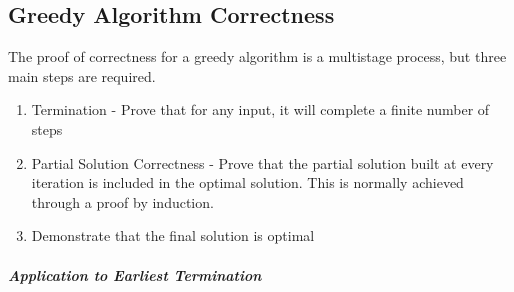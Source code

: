 \documentclass[12pt,letterpaper]{article}
\begin{document}
\subsection{Greedy Algorithm Correctness}
The proof of correctness for a greedy algorithm is a multistage process, but three main steps are required.
\begin{enumerate}
\item Termination - Prove that for any input, it will complete a finite number of steps
\item Partial Solution Correctness - Prove that the partial solution built at every iteration is included in the optimal solution. This is normally achieved through a proof by induction. 
\item Demonstrate that the final solution is optimal 
\end{enumerate}
\subparagraph{Application to Earliest Termination}
\end{document}
